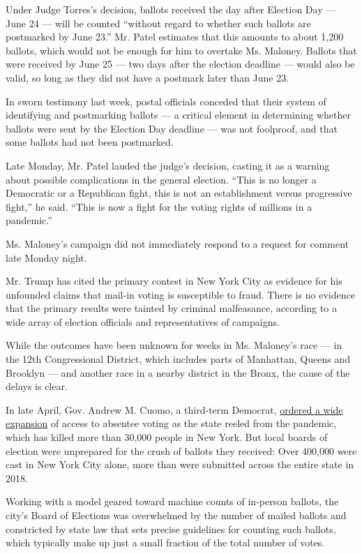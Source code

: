 Under Judge Torres's decision, ballots received the day after Election
Day --- June 24 --- will be counted ``without regard to whether such
ballots are postmarked by June 23.'' Mr. Patel estimates that this
amounts to about 1,200 ballots, which would not be enough for him to
overtake Ms. Maloney. Ballots that were received by June 25 --- two days
after the election deadline --- would also be valid, so long as they did
not have a postmark later than June 23.

In sworn testimony last week, postal officials conceded that their
system of identifying and postmarking ballots --- a critical element in
determining whether ballots were sent by the Election Day deadline ---
was not foolproof, and that some ballots had not been postmarked.

Late Monday, Mr. Patel lauded the judge's decision, casting it as a
warning about possible complications in the general election. ``This is
no longer a Democratic or a Republican fight, this is not an
establishment versus progressive fight,'' he said. ``This is now a fight
for the voting rights of millions in a pandemic.''

Ms. Maloney's campaign did not immediately respond to a request for
comment late Monday night.

Mr. Trump has cited the primary contest in New York City as evidence for
his unfounded claims that mail-in voting is susceptible to fraud. There
is no evidence that the primary results were tainted by criminal
malfeasance, according to a wide array of election officials and
representatives of campaigns.

While the outcomes have been unknown for weeks in Ms. Maloney's race ---
in the 12th Congressional District, which includes parts of Manhattan,
Queens and Brooklyn --- and another race in a nearby district in the
Bronx, the cause of the delays is clear.

In late April, Gov. Andrew M. Cuomo, a third-term Democrat,
\href{https://www.governor.ny.gov/news/amid-ongoing-covid-19-pandemic-governor-cuomo-issues-executive-order-make-sure-every-new-yorker}{ordered
a wide expansion} of access to absentee voting as the state reeled from
the pandemic, which has killed more than 30,000 people in New York. But
local boards of election were unprepared for the crush of ballots they
received: Over 400,000 were cast in New York City alone, more than were
submitted across the entire state in 2018.

Working with a model geared toward machine counts of in-person ballots,
the city's Board of Elections was overwhelmed by the number of mailed
ballots and constricted by state law that sets precise guidelines for
counting such ballots, which typically make up just a small fraction of
the total number of votes.

